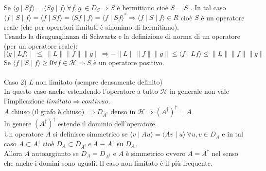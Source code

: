 Se $\langle g \mid Sf \rangle = \langle Sg \mid f \rangle \ \forall f,g \ \in D_{S} \Rightarrow S$ è hermitiano cioè $S=S^{\dag}$. In tal caso  $\langle f \mid S \mid f \rangle = \langle f \mid Sf \rangle = \langle Sf \mid f \rangle = \langle f \mid Sf \rangle ^{*} \Rightarrow \langle f \mid S \mid f \rangle \in R$ cioè $S$ è un operatore reale (che per operatori limitati è sinonimo di hermitiano).\\
Usando la disuguaglianza di Schwartz e la definizione di norma di un operatore (per un operatore reale): \\
$\mid \langle g \mid Lf \rangle \mid \ \leq \ \parallel L \parallel \parallel f \parallel \parallel g \parallel \Rightarrow - \parallel L \parallel \parallel f \parallel \parallel g \parallel \leq \langle f \mid Lf \rangle \leq \parallel L \parallel \parallel f \parallel \parallel g \parallel$ \\

Se $\langle f \mid S \mid f \rangle \geq 0 \forall f \in \mathcal{H} \Rightarrow S$ è un operatore positivo.
\\ \\
Caso 2) $L$ non limitato (sempre densamente definito) \\
In questo caso anche estendendo l'operatore a tutto $\mathcal{H}$ in generale non vale l'implicazione $limitato \Rightarrow continuo$. \\
$A$ chiuso (il grafo è chiuso) $\Rightarrow D_{A^{\dag}}$ denso in $\mathcal{H} \Rightarrow (A^{\dag})^{\dag}=A$\\
In genere $(A^{\dag})^{\dag}$ estende il dominio dell'operatore.\\
Un operatore $A$ si definisce simmetrico se $\langle v \mid Au \rangle = \langle Av \mid u \rangle \ \forall u,v \in D_{A}$ e in tal caso $A \subset A^{\dag}$ cioè $D_{A} \subset D_{A^{\dag}} \ e \ A\equiv A^{\dag}$ su $D_{A}$.\\
Allora $A$ autoaggiunto se $D_{A} = D_{A^{\dag}}$ e $A$ è simmetrico ovvero $A=A^{\dag}$ nel senso che anche i domini sono uguali.
Il caso non limitato è il più frequente. %

